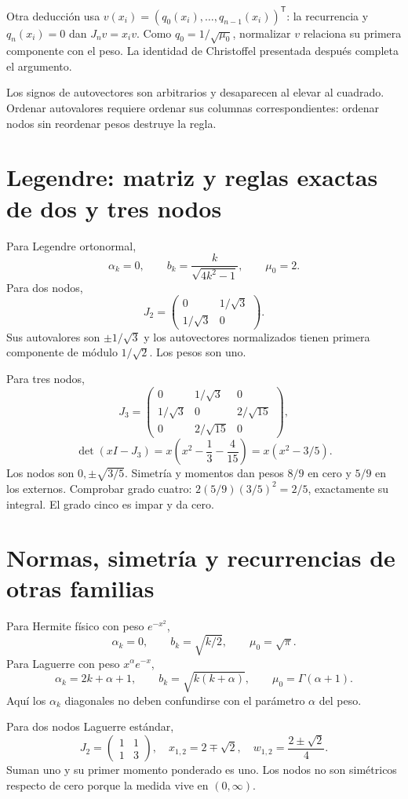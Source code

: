 \documentclass[11pt,a4paper]{article}
\newcommand{\T}{^{\mathsf T}}
\theoremstyle{definition}
\begin{document}
Otra deducción usa $v(x_i)=(q_0(x_i),\ldots,q_{n-1}(x_i))\T$:
la recurrencia y $q_n(x_i)=0$ dan $J_nv=x_iv$. Como $q_0=1/\sqrt{\mu_0}$, normalizar $v$ relaciona su primera componente con el peso. La identidad de Christoffel presentada después completa el argumento.

Los signos de autovectores son arbitrarios y desaparecen al elevar al cuadrado. Ordenar autovalores requiere ordenar sus columnas correspondientes: ordenar nodos sin reordenar pesos destruye la regla.

\section{Legendre: matriz y reglas exactas de dos y tres nodos}
Para Legendre ortonormal,
\[
\alpha_k=0,\qquad b_k=\frac{k}{\sqrt{4k^2-1}},\qquad \mu_0=2.
\]
Para dos nodos,
\[
J_2=\begin{pmatrix}0&1/\sqrt3\\1/\sqrt3&0\end{pmatrix}.
\]
Sus autovalores son $\pm1/\sqrt3$ y los autovectores normalizados tienen primera componente de módulo $1/\sqrt2$. Los pesos son uno.

Para tres nodos,
\[
J_3=\begin{pmatrix}
0&1/\sqrt3&0\\
1/\sqrt3&0&2/\sqrt{15}\\
0&2/\sqrt{15}&0
\end{pmatrix},
\]
\[
\det(xI-J_3)=x\left(x^2-\frac13-\frac4{15}\right)
=x(x^2-3/5).
\]
Los nodos son $0,\pm\sqrt{3/5}$. Simetría y momentos dan pesos $8/9$ en cero y $5/9$ en los externos. Comprobar grado cuatro:
$2(5/9)(3/5)^2=2/5$, exactamente su integral. El grado cinco es impar y da cero.

\section{Normas, simetría y recurrencias de otras familias}
Para Hermite físico con peso $e^{-x^2}$,
\[
\alpha_k=0,\qquad b_k=\sqrt{k/2},\qquad \mu_0=\sqrt\pi.
\]
Para Laguerre con peso $x^\alpha e^{-x}$,
\[
\alpha_k=2k+\alpha+1,\qquad
b_k=\sqrt{k(k+\alpha)},\qquad \mu_0=\Gamma(\alpha+1).
\]
Aquí los $\alpha_k$ diagonales no deben confundirse con el parámetro $\alpha$ del peso.

Para dos nodos Laguerre estándar,
\[
J_2=\begin{pmatrix}1&1\\1&3\end{pmatrix},
\quad x_{1,2}=2\mp\sqrt2,
\quad w_{1,2}=\frac{2\pm\sqrt2}{4}.
\]
Suman uno y su primer momento ponderado es uno. Los nodos no son simétricos respecto de cero porque la medida vive en $(0,\infty)$.
\end{document}
